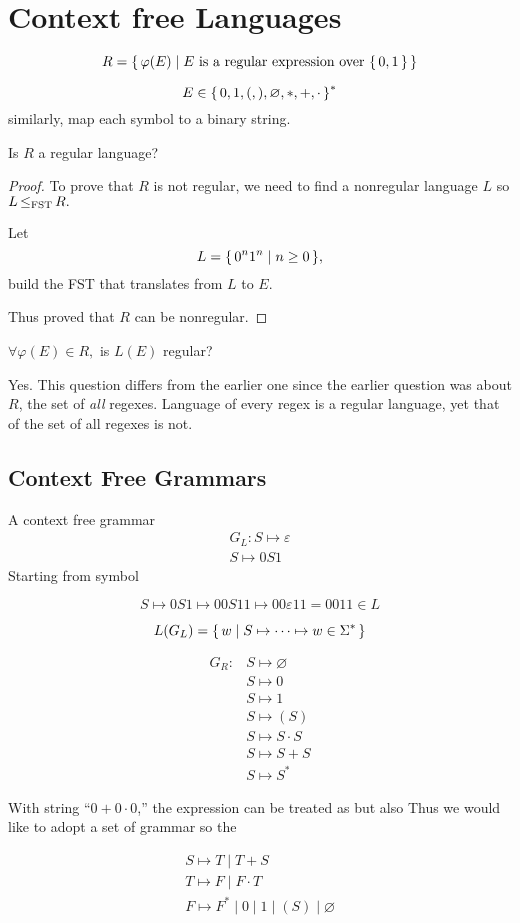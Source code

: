 
\section{Context free Languages}

\[
    R = { \left\{\, \varphi(E) \mid \text{$E$ is a regular expression over ${ \left\{\,0,1\,\right\} }$} \,\right\} }
\]

\[
    E \in { \left\{\,0,1,(,),\varnothing,*,+,\cdot\,\right\} }^*
\]
similarly, map each symbol to a binary string.

Is $R$ a regular language?

\begin{proof}
To prove that $R$ is not regular, we need to find a nonregular language $L$ so
$
L { \,\le_{\text{\upshape FST}}\, } R
.$

Let
\[
    L = { \left\{\, 0^n1^n \mid n\ge 0\,\right\} }
,\]
build the FST that translates from $L$ to $E$.

Thus proved that $R$ can be nonregular.
\end{proof}

$
\forall \varphi(E) \in R,
$
is $L(E)$ regular?

Yes. This question differs from the earlier one since the earlier question was about
$R$, the set of \emph{all} regexes. Language of every regex is a regular language, yet
that of the set of all regexes is not.

\subsection{Context Free Grammars}

\begin{definition}
    A context free grammar
    \begin{align*}
        G_L \colon S \mapsto \varepsilon \\
        S \mapsto 0S1
    \end{align*}
    Starting from symbol
\end{definition}

\begin{example}[]
    \[
        S \mapsto 0S1 \mapsto 00S11 \mapsto 00\varepsilon11 = 0011 \in L
    \]
\end{example}

\[
    L(G_L) = { \left\{\, w \mid S \mapsto \cdots \mapsto w \in \Sigma^* \,\right\} }
\]

\begin{align*}
    G_R \colon  &S \mapsto \varnothing  \\
                &S \mapsto 0            \\
                &S \mapsto 1            \\
                &S \mapsto (S)          \\
                &S \mapsto S \cdot S    \\
                &S \mapsto S + S        \\
                &S \mapsto S^*
\end{align*}

With string ``$0+0\cdot0$,'' the expression can be treated as
but also
Thus we would like to adopt a set of grammar so the 

\begin{align*}
S \mapsto T \mid T + S  \\
T \mapsto F \mid F \cdot T  \\
F \mapsto F^* \mid 0 \mid 1 \mid (S) \mid \varnothing
\end{align*}

